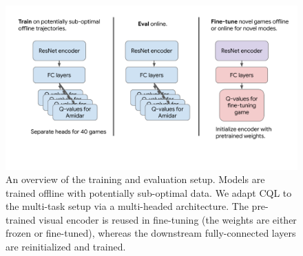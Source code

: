 \documentclass[../thesis.tex]{subfiles}
\begin{document}
\begin{figure}[t]
    \centering
    \includegraphics[width=0.75\linewidth]{chapters/scaled_ql/figures/fig_overview.pdf}
    \vspace{-0.3cm}
    \caption{\footnotesize{An overview of the training and evaluation setup. Models are trained offline with potentially sub-optimal data. We adapt CQL to the multi-task setup via a multi-headed architecture. The pre-trained visual encoder is reused in fine-tuning (the weights are either frozen or fine-tuned), whereas the downstream fully-connected layers are reinitialized and trained.}}
    \label{fig:overview}
    \vspace{-0.5cm}
\end{figure}
\end{document}
